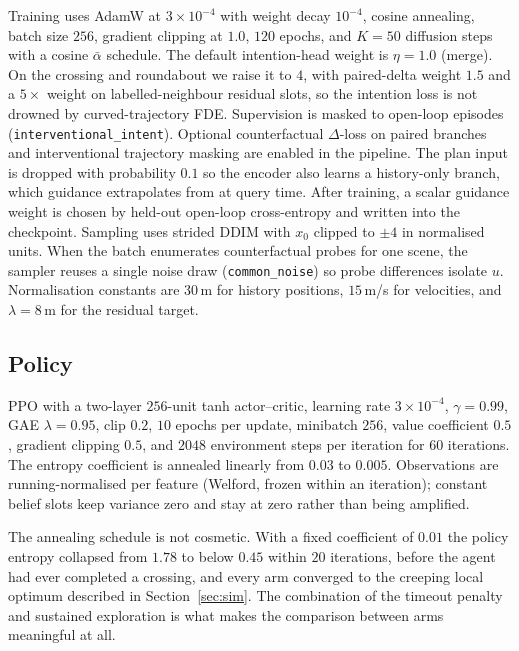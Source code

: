 \documentclass[conference]{IEEEtran}
\begin{document}
Training uses AdamW at $3\times10^{-4}$ with weight decay $10^{-4}$, cosine
annealing, batch size $256$, gradient clipping at $1.0$, $120$ epochs, and
$K=50$ diffusion steps with a cosine $\bar\alpha$ schedule. The default
intention-head weight is $\eta=1.0$ (merge). On the crossing and roundabout we
raise it to $4$, with paired-delta weight $1.5$ and a $5\times$ weight on
labelled-neighbour residual slots, so the intention loss is not drowned by
curved-trajectory FDE. Supervision is masked to open-loop episodes
(\texttt{interventional\_intent}). Optional counterfactual $\Delta$-loss on
paired branches and interventional trajectory masking are enabled in the
pipeline. The plan input is dropped with probability $0.1$ so the encoder also
learns a history-only branch, which guidance extrapolates from at query time.
After training, a scalar guidance weight is chosen by held-out open-loop
cross-entropy and written into the checkpoint. Sampling uses strided DDIM
\cite{song2021denoising} with $x_0$ clipped to $\pm 4$ in normalised units.
When the batch enumerates counterfactual probes for one scene, the sampler
reuses a single noise draw (\texttt{common\_noise}) so probe differences isolate
$u$. Normalisation constants are $30$\,m for history positions, $15$\,m/s for
velocities, and $\lambda = 8$\,m for the residual target.

\subsection{Policy}

PPO \cite{schulman2017proximal} with a two-layer $256$-unit tanh actor--critic,
learning rate $3\times10^{-4}$, $\gamma = 0.99$, GAE $\lambda = 0.95$, clip
$0.2$, $10$ epochs per update, minibatch $256$, value coefficient $0.5$, gradient
clipping $0.5$, and $2048$ environment steps per iteration for $60$ iterations.
The entropy coefficient is annealed linearly from $0.03$ to $0.005$.
Observations are running-normalised per feature (Welford, frozen within an
iteration); constant belief slots keep variance zero and stay at zero rather
than being amplified.

The annealing schedule is not cosmetic. With a fixed coefficient of $0.01$ the
policy entropy collapsed from $1.78$ to below $0.45$ within $20$ iterations,
before the agent had ever completed a crossing, and every arm converged to the
creeping local optimum described in Section~\ref{sec:sim}. The combination of the
timeout penalty and sustained exploration is what makes the comparison between
arms meaningful at all.
\end{document}
